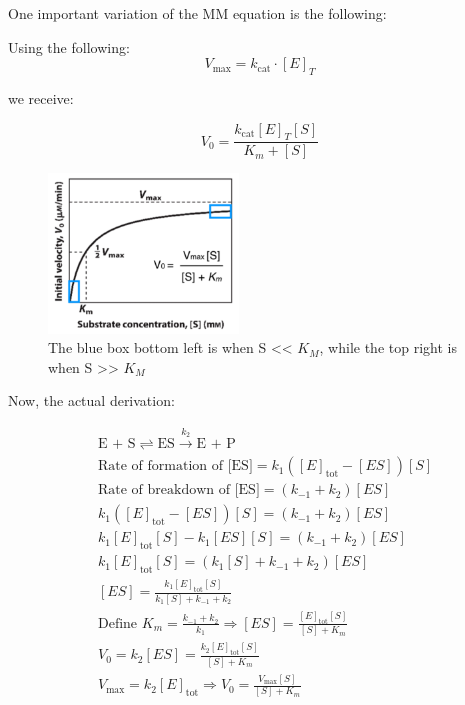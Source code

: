 \documentclass[../main.tex]{subfiles}
\begin{document}
One important variation of the MM equation is the following:

Using the following:
\begin{equation}
	V_{\max} = k_{\text{cat}} \cdot [E]_T
\end{equation}

we receive:

\begin{equation}
	V_{0} = \frac{k_{\text{cat}} [E]_T [S]}{K_m + [S]}
\end{equation}

\begin{figure}[h]
	\centering
	\includegraphics[width=0.45\textwidth]{MM}
	\caption{The blue box bottom left is when S << $K_{M}$, while the top right is when S >> $K_{M}$}
\end{figure}

Now, the actual derivation:

\begin{align*}
	&\text{E + S} \rightleftharpoons \text{ES} \xrightarrow{k_2} \text{E + P} \\[1ex]
	&\text{Rate of formation of [ES]} = k_1([E]_{\text{tot}} - [ES])[S] \\[1ex]
	&\text{Rate of breakdown of [ES]} = (k_{-1} + k_2)[ES] \\[1ex]
	&k_1([E]_{\text{tot}} - [ES])[S] = (k_{-1} + k_2)[ES] \\[1ex]
	&k_1[E]_{\text{tot}}[S] - k_1[ES][S] = (k_{-1} + k_2)[ES] \\[1ex]
	&k_1[E]_{\text{tot}}[S] = (k_1[S] + k_{-1} + k_2)[ES] \\[1ex]
	&[ES] = \frac{k_1[E]_{\text{tot}}[S]}{k_1[S] + k_{-1} + k_2} \\[1ex]
	&\text{Define } K_m = \frac{k_{-1} + k_2}{k_1} \Rightarrow [ES] = \frac{[E]_{\text{tot}}[S]}{[S] + K_m} \\[1ex]
	&V_0 = k_2[ES] = \frac{k_2[E]_{\text{tot}}[S]}{[S] + K_m} \\[1ex]
	&V_{\max} = k_2[E]_{\text{tot}} \Rightarrow V_0 = \frac{V_{\max}[S]}{[S] + K_m}
\end{align*}
\end{document}
